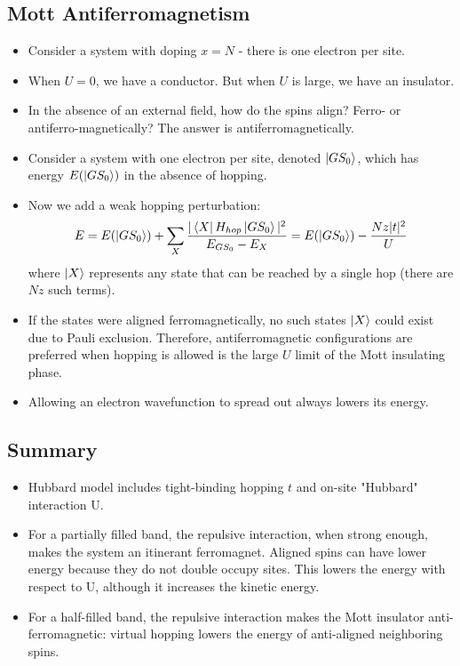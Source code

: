 \documentclass[10pt]{article}
\begin{document}
\subsection{Mott Antiferromagnetism}
\begin{itemize}
\item Consider a system with doping $x = N$ - there is one electron per site.
\item When $U = 0$, we have a conductor. But when $U$ is large, we have an insulator.
\item In the absence of an external field, how do the spins align? Ferro- or antiferro-magnetically?
The answer is antiferromagnetically.
\item Consider a system with one electron per site, denoted $\ket{GS_{0}}$, which has energy $E(\ket{GS_{0}})$ in
the absence of hopping.
\item Now we add a weak hopping perturbation:
$$
 E = E(\ket{GS_{0}}) + \sum_{X}\frac{|\bra{X}H_{hop}\ket{GS_{0}}|^{2}}{E_{GS_0} - E_{X}} = E(\ket{GS_{0}}) - \frac{Nz|t|^{2}}{U}
$$
where $\ket{X}$ represents any state that can be reached by a single hop (there are $Nz$ such terms).
\item If the states were aligned ferromagnetically, no such states $\ket{X}$ could exist due to Pauli exclusion. Therefore,
antiferromagnetic configurations are preferred when hopping is allowed is the large  $U$ limit of the Mott insulating phase.
\item Allowing an electron wavefunction to spread out always lowers its energy.
\end{itemize}

\subsection{Summary}
\begin{itemize}
  \item Hubbard model includes tight-binding hopping $t$ and on-site "Hubbard" interaction U.
  \item For a partially filled band, the repulsive interaction, when strong enough, makes the system
  an itinerant ferromagnet. Aligned spins can have lower energy because they do not double occupy sites.
  This lowers the energy with respect to U, although it increases the kinetic energy.
  \item For a half-filled band, the repulsive interaction makes the Mott insulator anti-ferromagnetic: virtual
  hopping lowers the energy of anti-aligned neighboring spins.
\end{itemize}
\end{document}

